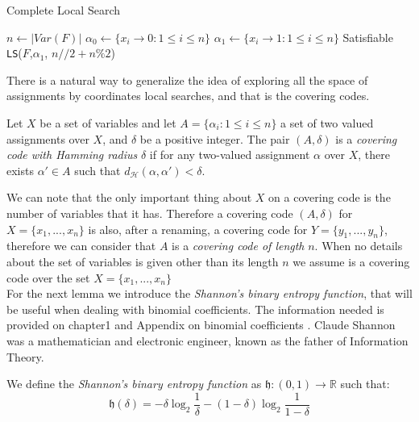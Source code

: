\begin{algorithm}
  \caption{Complete Local Search}\label{cls}
  \begin{algorithmic}[1]
    \State $n \gets |Var(F)|$
    \State $\alpha_0 \gets \{x_i \to 0 : 1 \le i \le n\}$
    \State $\alpha_1 \gets \{x_i \to 1 : 1 \le i \le n\}$
    \State
     \Return Satisfiable 
    \EndIf
    \State \Return \texttt{LS}($F$,$\alpha_1$, $n//2 + n\%2$)
	\EndProcedure
\end{algorithmic}
\end{algorithm}



There is a natural way to generalize the idea of exploring all the space of assignments by coordinates local searches, and that is the covering codes.

\begin{definition}
  Let $X$ be a set of variables and let $A = \{\alpha_i: 1 \le i \le n\}$ a set of two valued assignments over $X$, and $\delta$ be a positive integer. The pair $(A,\delta)$ is a \emph{covering code with Hamming radius} $\delta$ if for any  two-valued assignment  $\alpha$  over $X$, there exists $\alpha'\in A$ such that $d_\mathcal{H} (\alpha, \alpha') < \delta$.
\end{definition}


We can note that the only important thing about $X$ on a covering code is the number of variables that it has. Therefore a covering code $(A,\delta)$ for $X=\{x_1,...,x_n\}$ is also, after a renaming, a covering code for $Y=\{y_1,...,y_n\}$, therefore we can consider that $A$ is a \emph{covering code of length} $n$. When no details about the set of variables is given other than its length $n$ we assume is a covering code over the set $X = \{x_1,...,x_n\}$\\


For the next lemma we introduce the \emph{Shannon's binary entropy function}, that will be useful when dealing with binomial coefficients. The information needed is provided on chapter1 \cite{mackay2003information} and Appendix on binomial coefficients \cite{schoning2013satisfiability}. Claude Shannon was a mathematician and electronic engineer, known as the father of Information Theory. 

\begin{definition}
  We define the \emph{Shannon's binary entropy function} as $\mathfrak{h}:(0,1)\to \mathbb{R}$ such that:
  $$ \mathfrak{h}(\delta) = -  \delta \log_2 \frac{1}{\delta}  - (1-\delta)\log_2 \frac{1}{1-\delta}$$
\end{definition}

